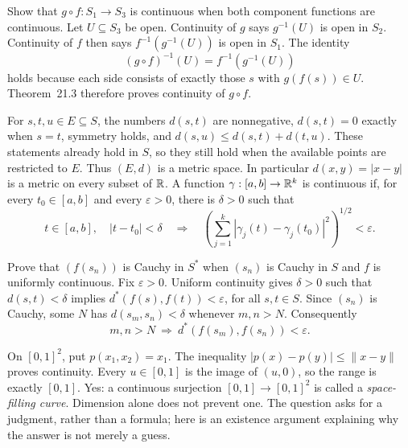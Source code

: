 \goal Show that $g\circ f:S_1\to S_3$ is continuous when both component
functions are continuous.
Let $U\subseteq S_3$ be open. Continuity of $g$ says $g^{-1}(U)$ is
open in $S_2$. Continuity of $f$ then says
$f^{-1}(g^{-1}(U))$ is open in $S_1$. The identity
\[
 (g\circ f)^{-1}(U)=f^{-1}(g^{-1}(U))
\]
holds because each side consists of exactly those $s$ with $g(f(s))\in U$.
Theorem~21.3 therefore proves continuity of $g\circ f$.

For $s,t,u\in E\subseteq S$, the numbers $d(s,t)$ are nonnegative,
$d(s,t)=0$ exactly when $s=t$, symmetry holds, and
$d(s,u)\le d(s,t)+d(t,u)$. These statements already hold in $S$,
so they still hold when the available points are restricted to $E$.
Thus $(E,d)$ is a metric space. In particular $d(x,y)=|x-y|$ is a
metric on every subset of $\mathbb{R}$.
A function $\gamma:[a,b]\to\mathbb{R}^k$ is continuous if, for every
$t_0\in[a,b]$ and every $\varepsilon>0$, there is $\delta>0$ such that
\[
 t\in[a,b],\quad |t-t_0|<\delta
 \quad\Longrightarrow\quad
 \left(\sum_{j=1}^k|\gamma_j(t)-\gamma_j(t_0)|^2\right)^{1/2}
 <\varepsilon.
\]

\goal Prove that $(f(s_n))$ is Cauchy in $S^*$ when $(s_n)$ is Cauchy
in $S$ and $f$ is uniformly continuous.
Fix $\varepsilon>0$. Uniform continuity gives $\delta>0$ such that
$d(s,t)<\delta$ implies $d^*(f(s),f(t))<\varepsilon$, for all $s,t\in S$.
Since $(s_n)$ is Cauchy, some $N$ has $d(s_m,s_n)<\delta$ whenever
$m,n>N$. Consequently
\[
 m,n>N\ \Longrightarrow\ d^*(f(s_m),f(s_n))<\varepsilon.
\]

On $[0,1]^2$, put $p(x_1,x_2)=x_1$. The inequality
$|p(x)-p(y)|\le\|x-y\|$ proves continuity. Every $u\in[0,1]$ is the
image of $(u,0)$, so the range is exactly $[0,1]$.
Yes: a continuous surjection $[0,1]\to[0,1]^2$ is called a
\emph{space-filling curve}. Dimension alone does not prevent one.
The question asks for a judgment, rather than a formula; here is an
existence argument explaining why the answer is not merely a guess.

